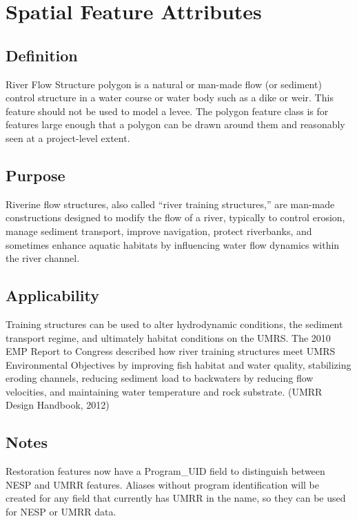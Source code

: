 \documentclass[
  letterpaper,
  DIV=11,
  numbers=noendperiod]{scrreprt}
\begin{document}
\section{Spatial Feature Attributes}\label{spatial-feature-attributes-2}

\subsection{Definition}\label{definition-11}

River Flow Structure polygon is a natural or man-made flow (or sediment)
control structure in a water course or water body such as a dike or
weir. This feature should not be used to model a levee. The polygon
feature class is for features large enough that a polygon can be drawn
around them and reasonably seen at a project-level extent.

\subsection{Purpose}\label{purpose-14}

Riverine flow structures, also called ``river training structures,'' are
man-made constructions designed to modify the flow of a river, typically
to control erosion, manage sediment transport, improve navigation,
protect riverbanks, and sometimes enhance aquatic habitats by
influencing water flow dynamics within the river channel.

\subsection{Applicability}\label{applicability-12}

Training structures can be used to alter hydrodynamic conditions, the
sediment transport regime, and ultimately habitat conditions on the
UMRS. The 2010 EMP Report to Congress described how river training
structures meet UMRS Environmental Objectives by improving fish habitat
and water quality, stabilizing eroding channels, reducing sediment load
to backwaters by reducing flow velocities, and maintaining water
temperature and rock substrate. (UMRR Design Handbook, 2012)

\subsection{Notes}\label{notes-14}

Restoration features now have a Program\_UID field to distinguish
between NESP and UMRR features. Aliases without program identification
will be created for any field that currently has UMRR in the name, so
they can be used for NESP or UMRR data.
\end{document}
